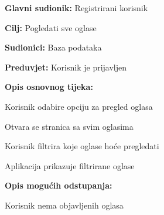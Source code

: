 				\noindent {}
					\begin{packed_item}
	
						\item \textbf{Glavni sudionik: }Registrirani korisnik
						\item  \textbf{Cilj:} Pogledati sve oglase
						\item  \textbf{Sudionici:} Baza podataka
						\item  \textbf{Preduvjet:} Korisnik je prijavljen
						\item  \textbf{Opis osnovnog tijeka:}
						
						\item[] \begin{packed_enum}
	
							\item Korisnik odabire opciju za pregled oglasa
							\item Otvara se stranica sa svim oglasima
							\item Korisnik filtrira koje oglase hoće pregledati
							\item Aplikacija prikazuje filtrirane oglase

						\end{packed_enum}
						
						\item  \textbf{Opis mogućih odstupanja:}
						
						\item[] \begin{packed_item}
	
							\item[2.a] Korisnik nema objavljenih oglasa
							
						\end{packed_item}					
					\end{packed_item}
					
